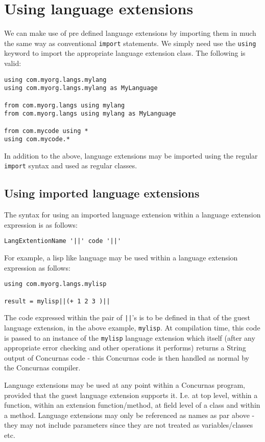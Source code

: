 \documentclass[conc-doc]{subfiles}
\begin{document}
\section{Using language extensions}
We can make use of pre defined language extensions by importing them in much the same way as conventional \lstinline{import} statements. We simply need use the \lstinline{using} keyword to import the appropriate language extension class. The following is valid:

\begin{lstlisting}
using com.myorg.langs.mylang
using com.myorg.langs.mylang as MyLanguage

from com.myorg.langs using mylang
from com.myorg.langs using mylang as MyLanguage

from com.mycode using *
using com.mycode.*
\end{lstlisting}

In addition to the above, language extensions may be imported using the regular \lstinline{import} syntax and used as regular classes.

\subsection{Using imported language extensions}
The syntax for using an imported language extension within a language extension expression is as follows:

\begin{center}
	\lstinline{LangExtentionName '||' code '||'}
\end{center}

For example, a lisp like language may be used within a language extension expression as follows:

\begin{lstlisting}
using com.myorg.langs.mylisp

result = mylisp||(+ 1 2 3 )||
\end{lstlisting}

The code expressed within the pair of \lstinline{||}'s is to be defined in that of the guest language extension, in the above example, \lstinline{mylisp}. At compilation time, this code is passed to an instance of the \lstinline{mylisp} language extension which itself (after any appropriate error checking and other operations it performs) returns a String output of Concurnas code - this Concurnas code is then handled as normal by the Concurnas compiler.

Language extensions may be used at any point within a Concurnas program, provided that the guest language extension supports it. I.e. at top level, within a function, within an extension function/method, at field level of a class and within a method. Language extensions may only be referenced as names as par above - they may not include parameters since they are not treated as variables/classes etc.
\end{document}
